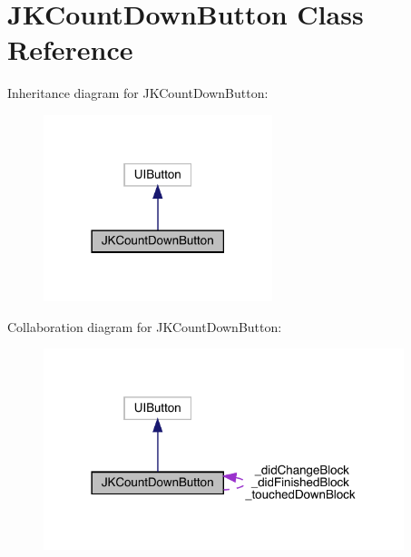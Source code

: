 \hypertarget{interface_j_k_count_down_button}{}\section{J\+K\+Count\+Down\+Button Class Reference}
\label{interface_j_k_count_down_button}


Inheritance diagram for J\+K\+Count\+Down\+Button\+:\nopagebreak
\begin{figure}[H]
\begin{center}
\leavevmode
\includegraphics[width=189pt]{interface_j_k_count_down_button__inherit__graph}
\end{center}
\end{figure}


Collaboration diagram for J\+K\+Count\+Down\+Button\+:\nopagebreak
\begin{figure}[H]
\begin{center}
\leavevmode
\includegraphics[width=298pt]{interface_j_k_count_down_button__coll__graph}
\end{center}
\end{figure}
